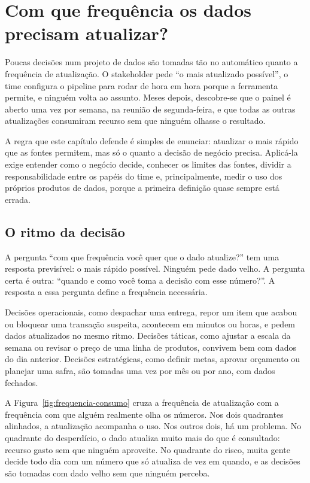 \chapter{Com que frequência os dados precisam atualizar?}
\label{cap:frequencia}

Poucas decisões num projeto de dados são tomadas tão no automático quanto a frequência de
atualização. O stakeholder pede \enquote{o mais atualizado possível}, o time configura o
pipeline para rodar de hora em hora porque a ferramenta permite, e ninguém volta ao assunto.
Meses depois, descobre-se que o painel é aberto uma vez por semana, na reunião de
segunda-feira, e que todas as outras atualizações consumiram recurso sem que ninguém olhasse
o resultado.

A regra que este capítulo defende é simples de enunciar: atualizar o mais rápido que as fontes
permitem, mas só o quanto a decisão de negócio precisa. Aplicá-la exige entender como o
negócio decide, conhecer os limites das fontes, dividir a responsabilidade entre os papéis
do time e, principalmente, medir o uso dos próprios produtos de dados, porque a primeira
definição quase sempre está errada.

\section{O ritmo da decisão}
\label{sec:ritmo-decisao}

A pergunta \enquote{com que frequência você quer que o dado atualize?} tem uma resposta
previsível: o mais rápido possível. Ninguém pede dado velho. A pergunta certa é outra:
\enquote{quando e como você toma a decisão com esse número?}. A resposta a essa pergunta define
a frequência necessária.

Decisões operacionais, como despachar uma entrega, repor um item que acabou ou bloquear uma
transação suspeita, acontecem em minutos ou horas, e pedem dados atualizados no mesmo ritmo.
Decisões táticas, como ajustar a escala da semana ou revisar o preço de uma linha de produtos,
convivem bem com dados do dia anterior. Decisões estratégicas, como definir metas, aprovar
orçamento ou planejar uma safra, são tomadas uma vez por mês ou por ano, com dados fechados.

A Figura~\ref{fig:frequencia-consumo} cruza a frequência de atualização com a frequência com
que alguém realmente olha os números. Nos dois quadrantes alinhados, a atualização acompanha o
uso. Nos outros dois, há um problema. No quadrante do desperdício, o dado atualiza muito mais do
que é consultado: recurso gasto sem que ninguém aproveite. No quadrante do risco, muita gente
decide todo dia com um número que só atualiza de vez em quando, e as decisões são tomadas com
dado velho sem que ninguém perceba.

